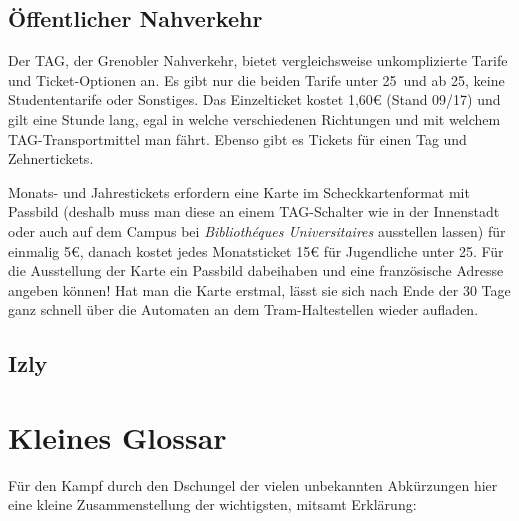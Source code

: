 \documentclass[11pt,a4paper]{article}
\begin{document}
	\subsection{Öffentlicher Nahverkehr}
	
	Der TAG, der Grenobler Nahverkehr, bietet vergleichsweise unkomplizierte Tarife und Ticket-Optionen an. Es gibt nur die beiden Tarife \glqq unter 25\grqq\ und \glqq ab 25\grqq , keine Studententarife oder Sonstiges. Das Einzelticket kostet 1,60€ (Stand 09/17) und gilt eine Stunde lang, egal in welche verschiedenen Richtungen und mit welchem TAG-Transportmittel man fährt. Ebenso gibt es Tickets für einen Tag und Zehnertickets.
	
	Monats- und Jahrestickets erfordern eine Karte im Scheckkartenformat mit Passbild (deshalb muss man diese an einem TAG-Schalter wie in der Innenstadt oder auch auf dem Campus bei \emph{Bibliothéques Universitaires} ausstellen lassen) für einmalig 5€, danach kostet jedes Monatsticket 15€ für Jugendliche unter 25. Für die Ausstellung der Karte ein Passbild dabeihaben und eine französische Adresse angeben können! Hat man die Karte erstmal, lässt sie sich nach Ende der 30 Tage ganz schnell über die Automaten an dem Tram-Haltestellen wieder aufladen.
	
	\subsection{Izly}
	
	\newpage
	\section{Kleines Glossar}
	
	Für den Kampf durch den Dschungel der vielen unbekannten Abkürzungen hier eine kleine Zusammenstellung der wichtigsten, mitsamt Erklärung:\\
	
\end{document}
